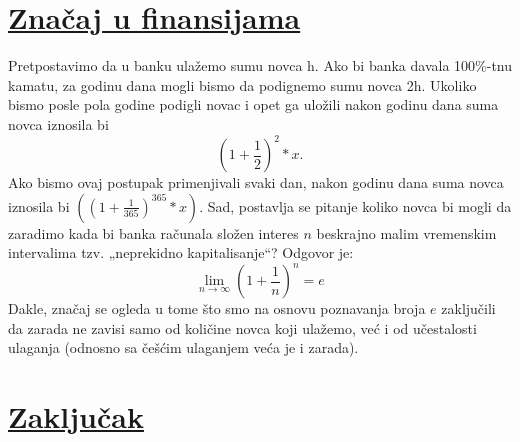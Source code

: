 \documentclass{article}
\begin{document}
\section*{\uline{Značaj u finansijama}}
Pretpostavimo da u banku ulažemo sumu novca h. Ako bi banka davala 100\%-tnu kamatu,
za godinu dana mogli bismo da podignemo sumu novca 2h. Ukoliko bismo posle pola
godine podigli novac i opet ga uložili nakon godinu dana suma novca iznosila bi
\begin{equation} (1+\frac{1}{2})^2*x. \end{equation}
Ako bismo ovaj postupak primenjivali svaki dan, nakon godinu dana suma novca
iznosila bi $((1+\frac{1}{365})^{365}*x)$. Sad, postavlja se pitanje koliko novca bi mogli da zaradimo kada bi banka računala složen interes $n$ beskrajno malim vremenskim intervalima tzv. „neprekidno kapitalisanje“? Odgovor je:
\begin{equation} \lim_{n \rightarrow \infty} (1+\frac{1}{n})^n=e \end{equation}
Dakle, značaj se ogleda u tome što smo na osnovu poznavanja broja $e$ zaključili da zarada ne zavisi samo od količine novca koji ulažemo, već i od učestalosti ulaganja (odnosno sa češćim ulaganjem veća je i zarada).\cite{alas}
\newpage{}
\section*{\uline {Zaključak}}
\paragraph{}
\end{document}
